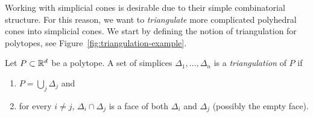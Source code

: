 Working with simplicial cones is desirable due to their simple combinatorial structure.
For this reason, we want to \emph{triangulate} more complicated polyhedral cones into simplicial cones.
We start by defining the notion of triangulation for polytopes,
see Figure~\ref{fig:triangulation-example}.

\begin{definition}
  Let $P \subset \mathbb{R}^d$ be a polytope.
  A set of simplices $\Delta_1, \ldots, \Delta_n$ is a \emph{triangulation} of $P$ if
  \begin{enumerate}
    \item $P = \bigcup_j \Delta_j$ and
    \item for every $i \neq j$, $\Delta_i \cap \Delta_j$ is a face of both $\Delta_i$ and $\Delta_j$ (possibly the empty face).
  \end{enumerate}
\end{definition}

